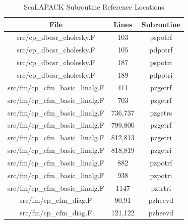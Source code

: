 \begin{table}[htbp]
\caption{ScaLAPACK Subroutine Reference Locations}
\begin{center}
\begin{tabular}{|c|c|c|}
\hline
\textbf{File} & \textbf{Lines} & \textbf{Subroutine} \\
\hline
src/cp\_dbcsr\_cholesky.F & {103} & pspotrf \\
\hline
src/cp\_dbcsr\_cholesky.F & {105} & pdpotrf \\
\hline
src/cp\_dbcsr\_cholesky.F & {187} & pspotri \\
\hline
src/cp\_dbcsr\_cholesky.F & {189} & pdpotri \\
\hline
src/fm/cp\_cfm\_basic\_linalg.F & {411} & pzgetrf \\
\hline
src/fm/cp\_cfm\_basic\_linalg.F & {703} & pzgetrf \\
\hline
src/fm/cp\_cfm\_basic\_linalg.F & {736,737} & pzgetrs \\
\hline
src/fm/cp\_cfm\_basic\_linalg.F & {799,800} & pzgetrf \\
\hline
src/fm/cp\_cfm\_basic\_linalg.F & {812,813} & pzgetri \\
\hline
src/fm/cp\_cfm\_basic\_linalg.F & {818,819} & pzgetri \\
\hline
src/fm/cp\_cfm\_basic\_linalg.F & {882} & pzpotrf \\
\hline
src/fm/cp\_cfm\_basic\_linalg.F & {938} & pzpotri \\
\hline
src/fm/cp\_cfm\_basic\_linalg.F & {1147} & pztrtri \\
\hline
src/fm/cp\_cfm\_diag.F & {90,91} & pzheevd \\
\hline
src/fm/cp\_cfm\_diag.F & {121,122} & pzheevd \\
\hline

\end{tabular}
\end{center}
\end{table}
